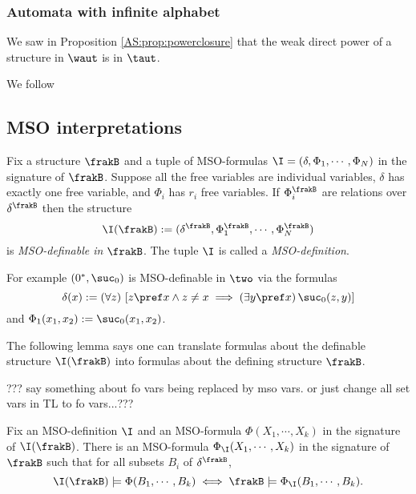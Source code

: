 








\iffalse




\subsubsection{Automata with infinite alphabet}

We saw in Proposition \ref{AS:prop:powerclosure} that the weak direct power of a structure in $\waut$ is in $\taut$.

We follow \cite{Bes08} 






\subsection{MSO interpretations}

Fix a structure $\frakB$ and a tuple of MSO-formulas $\I = (\delta, \Phi_1, \cdots, \Phi_N)$ in the signature of $\frakB$.
Suppose all the free variables are individual variables, $\delta$ has exactly one free variable, and $\Phi_i$ has $r_i$ free variables.
If $\Phi_i^\frakB$ are relations over $\delta^\frakB$ then the structure 
\[
\I(\frakB) := (\delta^\frakB, \Phi_1^\frakB, \cdots, \Phi_N^\frakB)
\] 
is {\em MSO-definable in $\frakB$}. The tuple $\I$ is called a {\em MSO-definition}.

For example $(0^\ast,\suc_0)$ is MSO-definable in $\two$ via the formulas
\[
\delta(x) := (\forall z)\, \left[z \pref x \wedge z \neq x \implies (\exists y \pref x)\,  \suc_0(z,y)\right]
\]
and $\Phi_1(x_1,x_2) := \suc_0(x_1,x_2)$. 


The following lemma says one can translate formulas about the definable structure $\I(\frakB)$ into formulas about the defining structure $\frakB$.

??? say something about fo vars being replaced by mso vars.
or just change all set vars in TL to fo vars...???
\begin{lemma} 
Fix an MSO-definition $\I$ and an MSO-formula $\Phi(X_1,\cdots,X_k)$ in the signature of $\I(\frakB)$.
There is an MSO-formula $\Phi_\I(X_1,\cdots,X_k)$ in the signature of $\frakB$ such that for all subsets $B_i$ of $\delta^\frakB$,
\[
\I(\frakB) \models \Phi(B_1,\cdots,B_k) \iff \frakB \models \Phi_\I(B_1,\cdots,B_k).
\]
\end{lemma}

